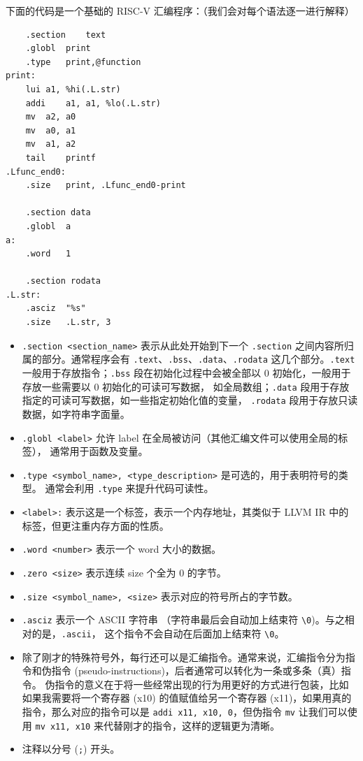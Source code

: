 下面的代码是一个基础的 RISC-V 汇编程序：（我们会对每个语法逐一进行解释）
\begin{lstlisting}
	.section	text
	.globl	print
	.type	print,@function
print:
	lui	a1, %hi(.L.str)
	addi	a1, a1, %lo(.L.str)
	mv	a2, a0
	mv	a0, a1
	mv	a1, a2
	tail	printf
.Lfunc_end0:
	.size	print, .Lfunc_end0-print

	.section data
	.globl	a
a:
	.word	1

	.section rodata
.L.str:
	.asciz	"%s"
	.size	.L.str, 3
\end{lstlisting}
\begin{itemize}
  \item \texttt{.section <section\_name>} 表示从此处开始到下一个
    \texttt{.section} 之间内容所归属的部分。通常程序会有
    \texttt{.text}、\texttt{.bss}、\texttt{.data}、\texttt{.rodata}
    这几个部分。\texttt{.text} 一般用于存放指令；\texttt{.bss}
    段在初始化过程中会被全部以 0 初始化，一般用于存放一些需要以 0 初始化的可读可写数据，
    如全局数组；\texttt{.data} 段用于存放指定的可读可写数据，如一些指定初始化值的变量，
    \texttt{.rodata} 段用于存放只读数据，如字符串字面量。
  \item \texttt{.globl <label>} 允许 label 在全局被访问（其他汇编文件可以使用全局的标签），
    通常用于函数及变量。
  \item \texttt{.type <symbol\_name>, <type\_description>} 是可选的，用于表明符号的类型。
    通常会利用 \texttt{.type} 来提升代码可读性。
  \item \texttt{<label>:} 表示这是一个标签，表示一个内存地址，其类似于 LLVM IR
    中的标签，但更注重内存方面的性质。
  \item \texttt{.word <number>} 表示一个 word 大小的数据。
  \item \texttt{.zero <size>} 表示连续 size 个全为 0 的字节。
  \item \texttt{.size <symbol\_name>, <size>} 表示对应的符号所占的字节数。
  \item \texttt{.asciz} 表示一个 ASCII 字符串
    （字符串最后会自动加上结束符 \texttt{\textbackslash0})。与之相对的是，\texttt{.ascii}，
    这个指令不会自动在后面加上结束符 \texttt{\textbackslash0}。
  \item 除了刚才的特殊符号外，每行还可以是汇编指令。通常来说，汇编指令分为指令和伪指令
    (pseudo-instructions)，后者通常可以转化为一条或多条（真）指令。
    伪指令的意义在于将一些经常出现的行为用更好的方式进行包装，比如如果我需要将一个寄存器
    (x10) 的值赋值给另一个寄存器 (x11)，如果用真的指令，那么对应的指令可以是
    \texttt{addi x11, x10, 0}，但伪指令 \texttt{mv} 让我们可以使用
    \texttt{mv x11, x10} 来代替刚才的指令，这样的逻辑更为清晰。
  \item 注释以分号 (\texttt{;}) 开头。
\end{itemize}


